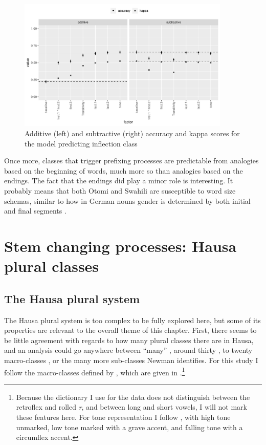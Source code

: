 \begin{figure}
  \centering
  \includegraphics[width=0.9\textwidth]{./figures/otomi/fact-imp.pdf}
  \caption{Additive (left) and subtractive (right) accuracy and kappa scores for the model predicting inflection class}\label{fig:fact-imp-otomi}
\end{figure}

Once more, classes that trigger prefixing processes are predictable from analogies based on the beginning of words, much more so than analogies based on the endings. The fact that the endings did play a minor role is interesting. It probably means that both Otomi and Swahili are susceptible to word size schemas, similar to how in German nouns gender is determined by both initial and final segments \autocite{Kopcke.1984}.%


\section{Stem changing processes: Hausa plural classes}


\subsection{The Hausa plural system}

The Hausa plural system is too complex to be fully explored here, but some of its properties are relevant to the overall theme of this chapter. First, there seems to be little agreement with regards to how many plural classes there are in Hausa, and an analysis could go anywhere between ``many'' \autocite{Migeod.1914}, around thirty \autocite{Schon.1862}, to twenty macro-classes \autocite{Newman.2000}, or the many more sub-classes Newman identifies. For this study I follow the macro-classes defined by \textcite{Newman.2000}, which are given in .\footnote{Because the dictionary I use for the data \autocite{Bargery.1951} does not distinguish between the retroflex and rolled \textit{r}, and between long and short vowels, I will not mark these features here. For tone representation I follow \textcite{Newman.2000}, with high tone unmarked, low tone marked with a grave accent, and falling tone with a circumflex accent.}

